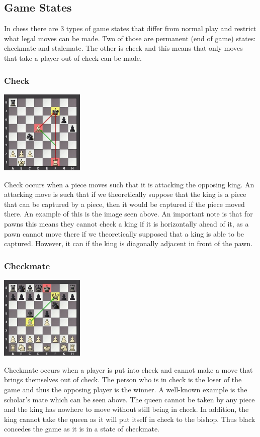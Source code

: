 \documentclass[]{report}
\begin{document}
\subsection{Game States}
In chess there are 3 types of game states that differ from normal play and restrict what legal moves can be made. Two of those are permanent (end of game) states: checkmate and stalemate. The other is check and this means that only moves that take a player out of check can be made. 
\subsubsection{Check}
\begin{center}
	\includegraphics[width=0.3\textwidth]{images/boards/check_example}
\end{center}
Check occurs when a piece moves such that it is attacking the opposing king. An attacking move is such that if we theoretically suppose that the king is a piece that can be captured by a piece, then it would be captured if the piece moved there. An example of this is the image seen above. An important note is that for pawns this means they cannot check a king if it is horizontally ahead of it, as a pawn cannot move there if we theoretically supposed that a king is able to be captured. However, it can if the king is diagonally adjacent in front of the pawn. 
\subsubsection{Checkmate}
\begin{center}
	\includegraphics[width=0.3\textwidth]{images/boards/checkmate_example}
\end{center}
Checkmate occurs when a player is put into check and cannot make a move that brings themselves out of check. The person who is in check is the loser of the game and thus the opposing player is the winner. A well-known example is the scholar’s mate which can be seen above. The queen cannot be taken by any piece and the king has nowhere to move without still being in check. In addition, the king cannot take the queen as it will put itself in check to the bishop. Thus black concedes the game as it is in a state of checkmate.
\end{document}
